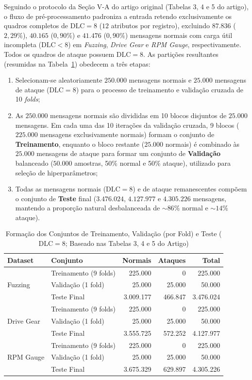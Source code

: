 \documentclass[conference]{IEEEtran}
\begin{document}
Seguindo o protocolo da Seção V-A do artigo original (Tabelas 3, 4 e 5 do artigo), o fluxo de pré-processamento padroniza a entrada retendo exclusivamente os quadros completos de $\text{DLC}=8$ ($12$ atributos por registro), excluindo $87.836$ ($2{,}29\%$), $40.165$ ($0{,}90\%$) e $41.476$ ($0{,}90\%$) mensagens normais com carga útil incompleta ($\text{DLC} < 8$) em \textit{Fuzzing}, \textit{Drive Gear} e \textit{RPM Gauge}, respectivamente. Todos os quadros de ataque possuem $\text{DLC}=8$. As partições resultantes (resumidas na Tabela~\ref{tab:splits}) obedecem a três etapas:
\begin{enumerate}
    \item Selecionam-se aleatoriamente $250.000$ mensagens normais e $25.000$ mensagens de ataque ($\text{DLC}=8$) para o processo de treinamento e validação cruzada de 10 \textit{folds};
    \item As $250.000$ mensagens normais são divididas em 10 blocos disjuntos de $25.000$ mensagens. Em cada uma das 10 iterações da validação cruzada, 9 blocos ($225.000$ mensagens exclusivamente normais) formam o conjunto de \textbf{Treinamento}, enquanto o bloco restante ($25.000$ normais) é combinado às $25.000$ mensagens de ataque para formar um conjunto de \textbf{Validação} balanceado ($50.000$ amostras, 50\% normal e 50\% ataque), utilizado para seleção de hiperparâmetros;
    \item Todas as mensagens normais ($\text{DLC}=8$) e de ataque remanescentes compõem o conjunto de \textbf{Teste} final ($3.476.024$, $4.127.977$ e $4.305.226$ mensagens, mantendo a proporção natural desbalanceada de $\sim 86\%$ normal e $\sim 14\%$ ataque).
\end{enumerate}

\begin{table}[htbp]
\caption{Formação dos Conjuntos de Treinamento, Validação (por Fold) e Teste ($\text{DLC}=8$; Baseado nas Tabelas 3, 4 e 5 do Artigo)}
\label{tab:splits}
\centering
\scriptsize
\setlength{\tabcolsep}{4pt}
\begin{tabular}{llrrr}
\toprule
\textbf{Dataset} & \textbf{Conjunto} & \textbf{Normais} & \textbf{Ataques} & \textbf{Total} \\
\midrule
\multirow{3}{*}{Fuzzing} & Treinamento (9 folds) & 225.000 & 0 & 225.000 \\
 & Validação (1 fold) & 25.000 & 25.000 & 50.000 \\
 & Teste Final & 3.009.177 & 466.847 & 3.476.024 \\
\midrule
\multirow{3}{*}{Drive Gear} & Treinamento (9 folds) & 225.000 & 0 & 225.000 \\
 & Validação (1 fold) & 25.000 & 25.000 & 50.000 \\
 & Teste Final & 3.555.725 & 572.252 & 4.127.977 \\
\midrule
\multirow{3}{*}{RPM Gauge} & Treinamento (9 folds) & 225.000 & 0 & 225.000 \\
 & Validação (1 fold) & 25.000 & 25.000 & 50.000 \\
 & Teste Final & 3.675.329 & 629.897 & 4.305.226 \\
\bottomrule
\end{tabular}
\end{table}
\end{document}
